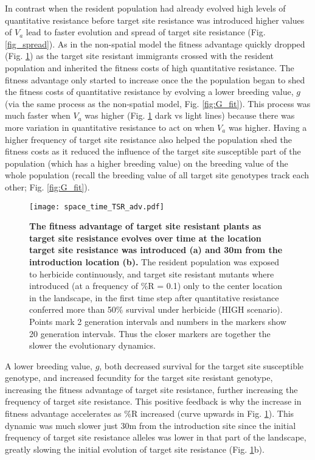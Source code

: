 \documentclass[10pt,letterpaper]{article}
\begin{document}
In contrast when the resident population had already evolved high levels of quantitative resistance before target site resistance was introduced higher values of $V_a$ lead to faster evolution and spread of target site resistance (Fig. \ref{fig_spread}). As in the non-spatial model the fitness advantage quickly dropped (Fig. \ref{fig:ts_TSR_adv}) as the target site resistant immigrants crossed with the resident population and inherited the fitness costs of high quantitative resistance. The fitness advantage only started to increase once the the population began to shed the fitness costs of quantitative resistance by evolving a lower breeding value, $g$ (via the same process as the non-spatial model, Fig. \ref{fig:G_fit}). This process was much faster when $V_a$ was higher (Fig. \ref{fig:ts_TSR_adv} dark vs light lines) because there was more variation in quantitative resistance to act on when $V_a$ was higher. Having a higher frequency of target site resistance also helped the population shed the fitness costs as it reduced the influence of the target site susceptible part of the population (which has a higher breeding value) on the breeding value of the whole population (recall the breeding value of all target site genotypes track each other; Fig. \ref{fig:G_fit}). 

\begin{figure}[!h] 
\texttt{[image: space\_time\_TSR\_adv.pdf]} 
\caption{{\bf The fitness advantage of target site resistant plants as target site resistance evolves over time at the location target site resistance was introduced (a) and 30m from the introduction location (b).} The resident population was exposed to herbicide continuously, and target site resistant mutants where introduced (at a frequency of \%R = 0.1) only to the center location in the landscape, in the first time step after quantitative resistance conferred more than 50\% survival under herbicide (HIGH scenario). Points mark 2 generation intervals and numbers in the markers show 20 generation intervals. Thus the closer markers are together the slower the evolutionary dynamics.} 
\label{fig:ts_TSR_adv}
\end{figure}

A lower breeding value, $g$, both decreased survival for the target site susceptible genotype, and increased fecundity for the target site resistant genotype, increasing the fitness advantage of target site resistance, further increasing the frequency of target site resistance. This positive feedback is why the increase in fitness advantage accelerates as \%R increased (curve upwards in Fig. \ref{fig:ts_TSR_adv}). This dynamic was much slower just 30m from the introduction site since the initial frequency of target site resistance alleles was lower in that part of the landscape, greatly slowing the initial evolution of target site resistance (Fig. \ref{fig:ts_TSR_adv}b).     
\end{document}
